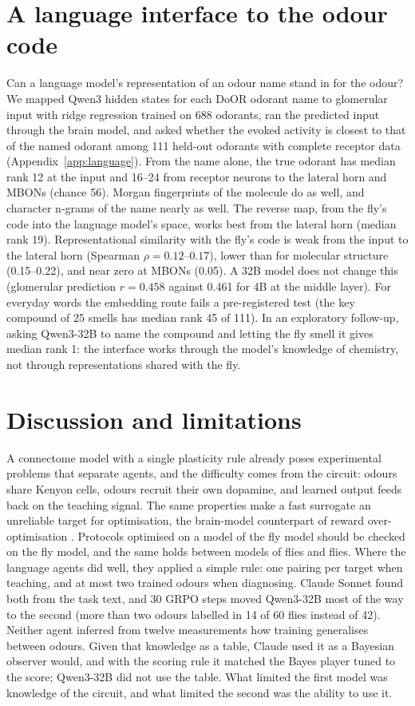 \documentclass{article}
\begin{document}
\section{A language interface to the odour code}\label{sec:language}
Can a language model's representation of an odour name stand in for the odour? We mapped Qwen3 hidden states for each DoOR odorant name to glomerular input with ridge regression trained on 688 odorants, ran the predicted input through the brain model, and asked whether the evoked activity is closest to that of the named odorant among 111 held-out odorants with complete receptor data (Appendix~\ref{app:language}). From the name alone, the true odorant has median rank 12 at the input and 16--24 from receptor neurons to the lateral horn and MBONs (chance 56). Morgan fingerprints of the molecule do as well, and character n-grams of the name nearly as well. The reverse map, from the fly's code into the language model's space, works best from the lateral horn (median rank 19). Representational similarity with the fly's code is weak from the input to the lateral horn (Spearman $\rho=0.12$--$0.17$), lower than for molecular structure (0.15--0.22), and near zero at MBONs (0.05). A 32B model does not change this (glomerular prediction $r=0.458$ against 0.461 for 4B at the middle layer). For everyday words the embedding route fails a pre-registered test (the key compound of 25 smells has median rank 45 of 111). In an exploratory follow-up, asking Qwen3-32B to name the compound and letting the fly smell it gives median rank 1: the interface works through the model's knowledge of chemistry, not through representations shared with the fly.

\section{Discussion and limitations}
A connectome model with a single plasticity rule already poses experimental problems that separate agents, and the difficulty comes from the circuit: odours share Kenyon cells, odours recruit their own dopamine, and learned output feeds back on the teaching signal. The same properties make a fast surrogate an unreliable target for optimisation, the brain-model counterpart of reward over-optimisation \citep{gao2023}. Protocols optimised on a model of the fly model should be checked on the fly model, and the same holds between models of flies and flies. Where the language agents did well, they applied a simple rule: one pairing per target when teaching, and at most two trained odours when diagnosing. Claude Sonnet found both from the task text, and 30 GRPO steps moved Qwen3-32B most of the way to the second (more than two odours labelled in 14 of 60 flies instead of 42). Neither agent inferred from twelve measurements how training generalises between odours. Given that knowledge as a table, Claude used it as a Bayesian observer would, and with the scoring rule it matched the Bayes player tuned to the score; Qwen3-32B did not use the table. What limited the first model was knowledge of the circuit, and what limited the second was the ability to use it.
\end{document}
